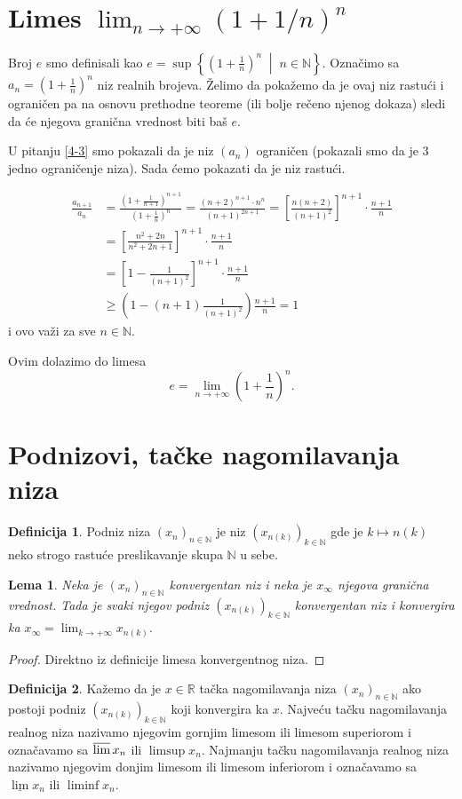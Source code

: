 \documentclass[a4paper,12pt]{article}
\theoremstyle{plain}
\newtheorem{lemma}[theorem]{Lema}
\theoremstyle{definition}
\newtheorem{definition}{Definicija}[section]
\theoremstyle{remark}
\begin{document}
\section{Limes \texorpdfstring{$\lim_{n\to+\infty} (1 + 1/n)^n$}{lim(1+1/n)\textasciicircum n}}
Broj $e$ smo definisali kao $e = \sup \left\{ \left(1 + \frac{1}{n}\right)^n \;\middle|\; n \in \mathbb{N} \right\}$. Označimo sa $a_n = \left(1 + \frac{1}{n}\right)^n$ niz realnih brojeva. Želimo da pokažemo da je ovaj niz rastući i ograničen pa na osnovu prethodne teoreme (ili bolje rečeno njenog dokaza) sledi da će njegova granična vrednost biti baš $e$.

U pitanju \ref{4-3} smo pokazali da je niz $(a_n)$ ograničen (pokazali smo da je $3$ jedno ograničenje niza). Sada ćemo pokazati da je niz rastući.

\begin{align*}
\frac{a_{n+1}}{a_n} &= \frac{\left(1 + \frac{1}{n+1}\right)^{n+1}}{\left(1 + \frac{1}{n}\right)^n} = \frac{(n+2)^{n+1} \cdot n^n}{(n+1)^{2n+1}} = \left[ \frac{n(n+2)}{(n+1)^2} \right]^{n+1} \cdot \frac{n+1}{n} \\
&= \left[ \frac{n^2 + 2n}{n^2 + 2n + 1} \right]^{n+1} \cdot \frac{n+1}{n} \\
&= \left[ 1 - \frac{1}{(n+1)^2} \right]^{n+1} \cdot \frac{n+1}{n} \\
&\geq \left( 1 - (n+1) \frac{1}{(n+1)^2} \right) \frac{n+1}{n} = 1
\end{align*}
i ovo važi za sve $n \in \mathbb{N}$.

Ovim dolazimo do limesa
$$ e = \lim_{n \to +\infty} \left(1 + \frac{1}{n}\right)^n. $$

\section{Podnizovi, tačke nagomilavanja niza}
\begin{definition}
Podniz niza $(x_n)_{n \in \mathbb{N}}$ je niz $(x_{n(k)})_{k \in \mathbb{N}}$ gde je $k \mapsto n(k)$ neko strogo rastuće preslikavanje skupa $\mathbb{N}$ u sebe.
\end{definition}
\begin{lemma}
Neka je $(x_n)_{n \in \mathbb{N}}$ konvergentan niz i neka je $x_{\infty}$ njegova granična vrednost. Tada je svaki njegov podniz $(x_{n(k)})_{k \in \mathbb{N}}$ konvergentan niz i konvergira ka $x_{\infty} = \lim_{k \to +\infty} x_{n(k)}$.
\end{lemma}
\begin{proof}
    Direktno iz definicije limesa konvergentnog niza.
\end{proof}
\begin{definition}
Kažemo da je $x \in \mathbb{R}$ tačka nagomilavanja niza $(x_n)_{n \in \mathbb{N}}$ ako postoji podniz $(x_{n(k)})_{k \in \mathbb{N}}$ koji konvergira ka $x$. Najveću tačku nagomilavanja realnog niza nazivamo njegovim gornjim limesom ili limesom superiorom i označavamo sa $\varlimsup x_n$ ili $\limsup x_n$. Najmanju tačku nagomilavanja realnog niza nazivamo njegovim donjim limesom ili limesom inferiorom i označavamo sa $\underline{\lim} x_n$ ili $\liminf x_n$.
\end{definition}
\end{document}
